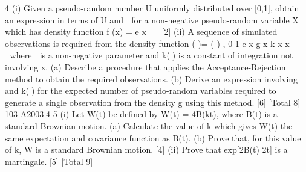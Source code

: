 \documentclass[a4paper,12pt]{article}
\begin{document}
\begin{enumerate}

4 (i) Given a pseudo-random number U uniformly distributed over [0,1], obtain an
expression in terms of U and  for a non-negative pseudo-random variable X
which has density function
f (x) = e x 
 [2]
(ii) A sequence of simulated observations is required from the density function
( )= ( ) , 0
1
e x g x k x
x

 

where  is a non-negative parameter and k() is a constant of integration not
involving x.
(a) Describe a procedure that applies the Acceptance-Rejection method to
obtain the required observations.
(b) Derive an expression involving  and k() for the expected number of
pseudo-random variables required to generate a single observation
from the density g using this method.
[6]
[Total 8]
103 A20034
5 (i) Let W(t) be defined by W(t) = 	4B(kt), where B(t) is a standard Brownian
motion.
(a) Calculate the value of k which gives W(t) the same expectation and
covariance function as B(t).
(b) Prove that, for this value of k, W is a standard Brownian motion.
[4]
(ii) Prove that exp[2B(t)	2t] is a martingale. [5]
[Total 9]



\end{enumerate}
\end{document}

